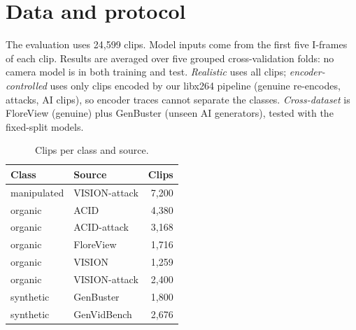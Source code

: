 \documentclass[11pt,a4paper]{article}
\begin{document}
\section{Data and protocol}
The evaluation uses 24,599 clips. Model inputs come from the first five I-frames of each clip. Results are averaged over five grouped cross-validation folds: no camera model is in both training and test. \emph{Realistic} uses all clips; \emph{encoder-controlled} uses only clips encoded by our libx264 pipeline (genuine re-encodes, attacks, AI clips), so encoder traces cannot separate the classes. \emph{Cross-dataset} is FloreView (genuine) plus GenBuster (unseen AI generators), tested with the fixed-split models.
\begin{table}[H]\centering\small\caption{Clips per class and source.}\begin{tabular}{llr}\toprule Class & Source & Clips \\\midrule
manipulated & VISION-attack & 7,200 \\
organic & ACID & 4,380 \\
organic & ACID-attack & 3,168 \\
organic & FloreView & 1,716 \\
organic & VISION & 1,259 \\
organic & VISION-attack & 2,400 \\
synthetic & GenBuster & 1,800 \\
synthetic & GenVidBench & 2,676 \\
\bottomrule\end{tabular}\end{table}
\end{document}

